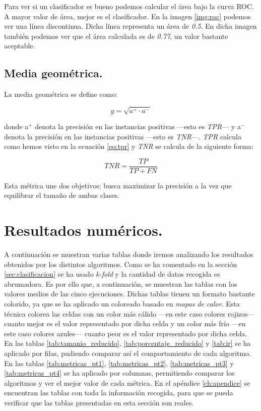 Para ver si un clasificador es bueno podemos calcular el área bajo la curva ROC. A mayor valor de área, mejor es el clasificador. En la imagen \ref{img:roc} podemos ver una línea discontinua. Dicha línea representa un área de \textit{0.5}. En dicha imagen también podemos ver que el área calculada es de \textit{0.77}, un valor bastante aceptable.

\subsection{Media geométrica.} \label{subsec:gm}

La media geométrica \cite{gm} se define como:

\begin{equation}
	g = \sqrt{a^+ \cdot a^-}
\end{equation}

donde a$^+$ denota la precisión en las instancias positivas —esto es \textit{TPR}— y a$^-$ denota la precisión en las instancias positivas —esto es \textit{TNR}—. \textit{TPR} calcula como hemos visto en la ecuación \ref{eq:tpr} y \textit{TNR} se calcula de la siguiente forma:

\begin{equation}
	TNR = \frac{TP}{TP + FN}
\end{equation}

Esta métrica une dos objetivos; busca maximizar la precisión a la vez que equilibrar el tamaño de ambas clases.

\section{Resultados numéricos.} \label{sec:resultados_numericos}

A continuación se muestran varias tablas donde iremos analizando los resultados obtenidos por los distintos algoritmos. Como se ha comentado en la sección \ref{sec:clasificacion} se ha usado \textit{k-fold} y la cantidad de datos recogida es abrumadora. Es por ello que, a continuación, se muestran las tablas con los valores medios de las cinco ejecuciones. Dichas tablas tienen un formato bastante colorido, ya que se ha aplicado un coloreado basado en \textit{mapas de calor}. Esta técnica colorea las celdas con un color más cálido —en este caso colores rojizos— cuanto mejor es el valor representado por dicha celda y un color más frío —en este caso colores azules— cuanto peor es el valor representado por dicha celda. En las tablas \ref{tab:tamanio_reducido}, \ref{tab:porcentaje_reducido} y \ref{tab:ir} se ha aplicado por filas, pudiendo comparar así el comportamiento de cada algoritmo. En las tablas \ref{tab:metricas_pt1}, \ref{tab:metricas_pt2}, \ref{tab:metricas_pt3} y \ref{tab:metricas_pt4} se ha aplicado por columnas, permitiendo comparar los algoritmos y ver el mejor valor de cada métrica. En el apéndice \ref{ch:apendice} se encuentran las tablas con toda la información recogida, para que se pueda verificar que las tablas presentadas en esta sección son reales. \\

